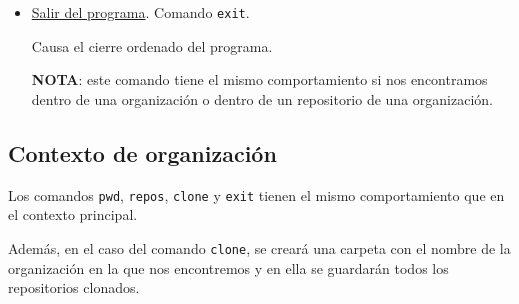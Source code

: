 \begin{itemize}
		

\newpage		
		\item  \underline{Salir del programa}. Comando \verb|exit|.
		
		\bigskip
		Causa el cierre ordenado del programa.
		\bigskip
				
		{\bfseries NOTA}: este comando tiene el mismo comportamiento si nos encontramos dentro de una organización o dentro de un repositorio de una organización. 
		
	\end{itemize}

\subsection{Contexto de organización}
\label{subsec:b.2.2}

	Los comandos \verb|pwd|, \verb|repos|, \verb|clone| y \verb|exit| tienen el mismo comportamiento que en el contexto principal. 
\bigskip

	Además, en el caso del comando \verb|clone|, se creará una carpeta con el nombre de la organización en la que nos encontremos y en ella se guardarán todos los repositorios clonados.
	
